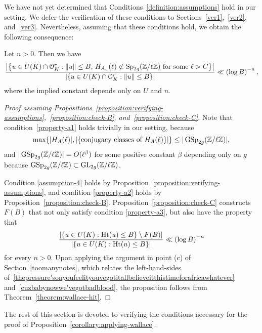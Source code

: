 We have not yet determined that Conditions~\ref{definition:assumptions} hold in our setting. We defer the verification of these conditions to Sections~\ref{ver1},~\ref{ver2}, and~\ref{ver3}. Nevertheless, assuming that these conditions hold, we obtain the following consequence:
	\begin{proposition} \label{corollary:applying-wallace}
		Let $n>0$. Then we have
		\begin{equation}\label{cuzbabynowwe'vegotbadblood}
			\frac{\left|\left\{ u \in U(K) \cap \mathcal{O}_K^r : \|u \| \leq B,\, H_{A_u}(\ell) \not \subset \operatorname{Sp}_{2g}(\mathbb Z/ \ell \mathbb Z) \text{ for some } \ell  > C \right\}\right|}{\left|\left\{ u \in U(K) \cap \mathcal O_K^r : \|u \| \leq B \right\} \right|} \ll \left( \log B \right)^{-n},
		\end{equation}
        where the implied constant depends only on $U$ and $n$.
	\end{proposition}
	\begin{proof}[Proof assuming Propositions~\ref{proposition:verifying-assumptions},~\ref{proposition:check-B}, and~\ref{proposition:check-C}]
Note that condition~\ref{property-a1} holds trivially in our setting, because
\[
	\max\{|H_A(\ell)|, |\{\text{conjugacy classes of $H_A(\ell)$}\}|\} \leq |\operatorname{GSp}_{2g}(\mathbb Z/\ell \mathbb Z)|,
\]
and $|\operatorname{GSp}_{2g}(\mathbb Z/\ell \mathbb Z)| = O(\ell^\beta)$ for some positive constant $\beta$ depending only on $g$ because $\operatorname{GSp}_{2g}({\mathbb Z}/\ell{\mathbb Z}) \subset \operatorname{GL}_{2g}({\mathbb Z}/\ell{\mathbb Z})$.

Condition \ref{assumption-4} holds by Proposition~\ref{proposition:verifying-assumptions}, and condition \ref{property-a2} holds by Proposition~\ref{proposition:check-B}. Proposition~\ref{proposition:check-C} constructs $F(B)$ that not only satisfy condition \ref{property-a3}, but also have the property that
		\begin{equation*}
			\frac{|\{u \in U(K) : \operatorname{Ht}(u) \le B\} \setminus F(B) |}{|\{u \in U(K) : \operatorname{Ht}(u) \le B\}|} \ll \left( \log B \right)^{-n}
            \end{equation*}
            for every $n >0$. Upon applying the argument in point (c) of Section~\ref{toomanynotes}, which relates the left-hand-sides of~\eqref{thepressure'sonyoufeelityouvegotitallbelieveitthistimeforafricawhatever} and~\eqref{cuzbabynowwe'vegotbadblood}, the proposition follows from Theorem~\ref{theorem:wallace-hit}.		
	\end{proof}

The rest of this section is devoted to verifying the conditions necessary for the proof of Proposition~\ref{corollary:applying-wallace}.
	
